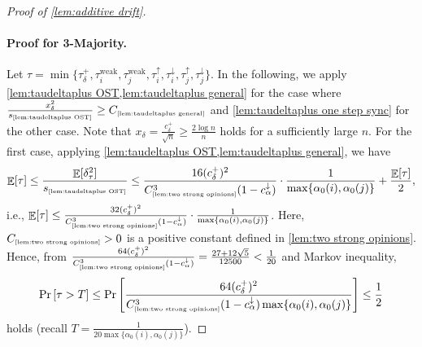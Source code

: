 \documentclass[letterpaper,11pt]{article}
\DeclareMathOperator*{\E}{\mathbb{E}}
\newcommand{\constref}[1]{C_{\mbox{\tiny\ref{#1}}}}
\newcommand{\constrefs}[2]{C_{\mbox{\tiny\ref{#1}(\ref{#2})}}}
\newcommand{\varianceref}[1]{\variance_{\mbox{\tiny\ref{#1}}}}
\newcommand{\taudeltaplus}{\tau^{+}_\delta}
\newcommand{\cweak}{c^{\mathrm{weak}}}
\newcommand{\calphadown}{c^{\downarrow}_\alpha}
\newcommand{\cdeltaplus}{c^{+}_\delta}
\newcommand{\variance}{s}
\newcommand{\tauiup}{\tau^{\uparrow}_i}
\newcommand{\ciup}{c_\alpha^{\uparrow}}
\newcommand{\tauidown}{\tau^{\downarrow}_i}
\newcommand{\tauiweak}{\tau^{\mathrm{weak}}_i}
\newcommand{\taujweak}{\tau^{\mathrm{weak}}_j}
\newcommand{\taujup}{\tau^{\uparrow}_j}
\newcommand{\taujdown}{\tau^{\downarrow}_j}
\newcommand{\xdelta}{x_{\delta}}
\begin{document}
\begin{proof}[Proof of \cref{lem:additive drift}]
  \paragraph*{Proof for 3-Majority.}
%
  Let $\tau=\min\{\taudeltaplus,\tauiweak,\taujweak,\tauiup,\tauidown,\taujup,\taujdown\}$.
  In the following, we apply \cref{lem:taudeltaplus OST,lem:taudeltaplus general} for the case where 
  $\frac{\xdelta^2}{\varianceref{lem:taudeltaplus OST}}\geq \constref{lem:taudeltaplus general}$
  and \cref{lem:taudeltaplus one step sync} for the other case.
%
  Note that $\xdelta=\frac{\cdeltaplus}{\sqrt{n}}\geq \frac{2\log n}{n}$ holds for a sufficiently large $n$.
  For the first case, applying \cref{lem:taudeltaplus OST,lem:taudeltaplus general}, we have
  \begin{align*}
    \E[\tau]\leq \frac{\E[\delta_\tau^2]}{\varianceref{lem:taudeltaplus OST}}\leq \frac{16(\cdeltaplus)^2}{\constref{lem:two strong opinions}^3(1-\calphadown)}\cdot \frac{1}{\max\{\alpha_0(i),\alpha_0(j)\}}+\frac{\E[\tau]}{2},
  \end{align*}
  i.e., $\E[\tau]\leq \frac{32(\cdeltaplus)^2}{\constref{lem:two strong opinions}^3(1-\calphadown)}\cdot \frac{1}{\max\{\alpha_0(i),\alpha_0(j)\}}$. 
  Here, $\constref{lem:two strong opinions}>0$ is a positive constant defined in \cref{lem:two strong opinions}.
  Hence, from $\frac{64(\cdeltaplus)^2}{\constref{lem:two strong opinions}^3(1-\calphadown)}=\frac{27+12\sqrt{5}}{12500} <\frac{1}{20}$ and Markov inequality,
    \begin{align}
      \Pr\qty[\tau> T]
      \leq 
      \Pr\qty[\frac{64(\cdeltaplus)^2}{\constref{lem:two strong opinions}^3(1-\calphadown)\max\{\alpha_0(i),\alpha_0(j)\}}]
      \leq \frac{1}{2} \label{eq:taudeltaplus case1 3maj}
    \end{align}
    holds (recall $T=\frac{1}{20\max\{\alpha_0(i),\alpha_0(j)\}}$). 
    

\end{proof}
\end{document}
